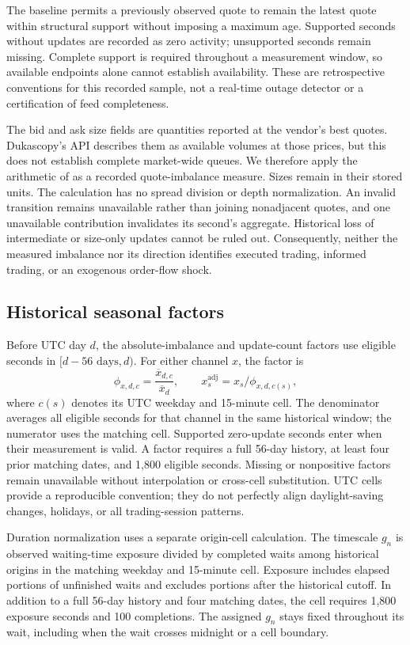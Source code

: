 \documentclass[12pt,letterpaper]{article}
\begin{document}
The baseline permits a previously observed quote to remain the latest quote within structural support without imposing a maximum age. Supported seconds without updates are recorded as zero activity; unsupported seconds remain missing. Complete support is required throughout a measurement window, so available endpoints alone cannot establish availability. These are retrospective conventions for this recorded sample, not a real-time outage detector or a certification of feed completeness.

The bid and ask size fields are quantities reported at the vendor's best quotes. Dukascopy's API describes them as available volumes at those prices, but this does not establish complete market-wide queues. We therefore apply the arithmetic of \citet{cont2014price} as a recorded quote-imbalance measure. Sizes remain in their stored units. The calculation has no spread division or depth normalization. An invalid transition remains unavailable rather than joining nonadjacent quotes, and one unavailable contribution invalidates its second's aggregate. Historical loss of intermediate or size-only updates cannot be ruled out. Consequently, neither the measured imbalance nor its direction identifies executed trading, informed trading, or an exogenous order-flow shock.

\subsection{Historical seasonal factors}
Before UTC day $d$, the absolute-imbalance and update-count factors use eligible seconds in $[d-56\text{ days},d)$. For either channel $x$, the factor is
\begin{equation}
 \phi_{x,d,c}=\frac{\overline{x}_{d,c}}{\overline{x}_{d}},
 \qquad x_s^{\mathrm{adj}}=x_s/\phi_{x,d,c(s)},
 \label{eq:app-seasonal}
\end{equation}
where $c(s)$ denotes its UTC weekday and 15-minute cell. The denominator averages all eligible seconds for that channel in the same historical window; the numerator uses the matching cell. Supported zero-update seconds enter when their measurement is valid. A factor requires a full 56-day history, at least four prior matching dates, and 1,800 eligible seconds. Missing or nonpositive factors remain unavailable without interpolation or cross-cell substitution. UTC cells provide a reproducible convention; they do not perfectly align daylight-saving changes, holidays, or all trading-session patterns.

Duration normalization uses a separate origin-cell calculation. The timescale $g_n$ is observed waiting-time exposure divided by completed waits among historical origins in the matching weekday and 15-minute cell. Exposure includes elapsed portions of unfinished waits and excludes portions after the historical cutoff. In addition to a full 56-day history and four matching dates, the cell requires 1,800 exposure seconds and 100 completions. The assigned $g_n$ stays fixed throughout its wait, including when the wait crosses midnight or a cell boundary.
\end{document}
